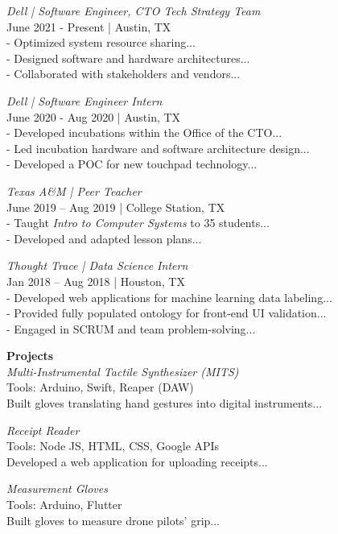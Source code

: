 \documentclass[11pt]{article}
\begin{document}
\textit{Dell | Software Engineer, CTO Tech Strategy Team} \\
June 2021 - Present | Austin, TX \\
- Optimized system resource sharing... \\
- Designed software and hardware architectures... \\
- Collaborated with stakeholders and vendors...

\vspace{2mm}

\textit{Dell | Software Engineer Intern} \\
June 2020 - Aug 2020 | Austin, TX \\
- Developed incubations within the Office of the CTO... \\
- Led incubation hardware and software architecture design... \\
- Developed a POC for new touchpad technology...

\vspace{2mm}

\textit{Texas A\&M | Peer Teacher} \\
June 2019 – Aug 2019 | College Station, TX \\
- Taught {\it Intro to Computer Systems} to 35 students... \\
- Developed and adapted lesson plans...

\vspace{2mm}

\textit{Thought Trace | Data Science Intern} \\
Jan 2018 – Aug 2018 | Houston, TX \\
- Developed web applications for machine learning data labeling... \\
- Provided fully populated ontology for front-end UI validation... \\
- Engaged in SCRUM and team problem-solving...

\vspace{2mm}

\noindent\textbf{Projects} \\
\textit{Multi-Instrumental Tactile Synthesizer (MITS)} \\
Tools: Arduino, Swift, Reaper (DAW) \\
Built gloves translating hand gestures into digital instruments...

\vspace{2mm}

\textit{Receipt Reader} \\
Tools: Node JS, HTML, CSS, Google APIs \\
Developed a web application for uploading receipts...

\vspace{2mm}

\textit{Measurement Gloves} \\
Tools: Arduino, Flutter \\
Built gloves to measure drone pilots' grip...
\end{document}
